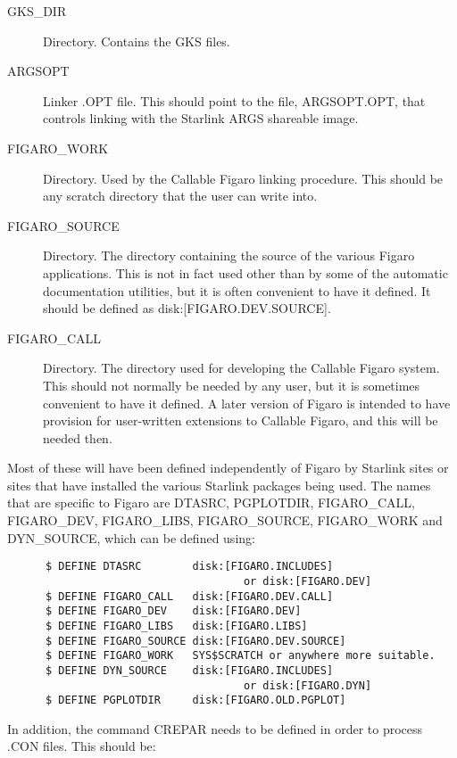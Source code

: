 \begin{description}
\item [GKS\_DIR] Directory. Contains the GKS files.

\item [ARGSOPT] Linker .OPT file. This should point to the file, ARGSOPT.OPT,
that controls linking with the Starlink ARGS shareable image.

\item [FIGARO\_WORK] Directory. Used by the Callable Figaro linking procedure.
This should be any scratch directory that the user can write into.

\item [FIGARO\_SOURCE] Directory. The directory containing the source of the
various Figaro applications. This is not in fact used other than by some  of
the automatic documentation utilities, but it is often convenient to have it
defined. It should be defined as disk:[FIGARO.DEV.SOURCE].

\item [FIGARO\_CALL] Directory. The directory used for developing the Callable
Figaro system. This should not normally be needed by any user, but it is
sometimes convenient to have it defined. A later version of Figaro is intended
to have provision for user-written extensions to Callable Figaro, and this will
be needed then. 

\end{description} 

Most of these will have been defined independently of Figaro by Starlink sites 
or sites that have installed the various Starlink packages being used. The
names that are specific to Figaro are DTASRC, PGPLOTDIR, FIGARO\_CALL,
FIGARO\_DEV, FIGARO\_LIBS, FIGARO\_\-SOURCE, FIGARO\_WORK and  DYN\_SOURCE,
which can be defined using:

\begin{verbatim}
      $ DEFINE DTASRC        disk:[FIGARO.INCLUDES] 
                                     or disk:[FIGARO.DEV]
      $ DEFINE FIGARO_CALL   disk:[FIGARO.DEV.CALL]
      $ DEFINE FIGARO_DEV    disk:[FIGARO.DEV]
      $ DEFINE FIGARO_LIBS   disk:[FIGARO.LIBS]
      $ DEFINE FIGARO_SOURCE disk:[FIGARO.DEV.SOURCE]
      $ DEFINE FIGARO_WORK   SYS$SCRATCH or anywhere more suitable.
      $ DEFINE DYN_SOURCE    disk:[FIGARO.INCLUDES] 
                                     or disk:[FIGARO.DYN]
      $ DEFINE PGPLOTDIR     disk:[FIGARO.OLD.PGPLOT]
\end{verbatim}

In addition, the command CREPAR needs to be defined in order to process .CON
files. This should be:

